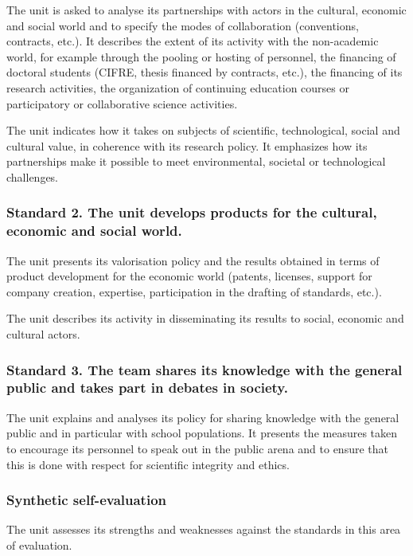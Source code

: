 \begin{hceresinstructions}
  The unit is asked to analyse its partnerships with actors in the
  cultural, economic and social world and to specify the modes of
  collaboration (conventions, contracts, etc.). It describes the extent of
  its activity with the non-academic world, for example through the
  pooling or hosting of personnel, the financing of doctoral students
  (CIFRE, thesis financed by contracts, etc.), the financing of its
  research activities, the organization of continuing education courses or
  participatory or collaborative science activities.

  The unit indicates how it takes on subjects of scientific,
  technological, social and cultural value, in coherence with its research
  policy. It emphasizes how its partnerships make it possible to meet
  environmental, societal or technological challenges.
\end{hceresinstructions}

\subsubsection*{Standard 2. The unit develops products for the cultural, economic and
social world.}

\begin{hceresinstructions}
  The unit presents its valorisation policy and the results obtained in
  terms of product development for the economic world (patents, licenses,
  support for company creation, expertise, participation in the drafting
  of standards, etc.).

  The unit describes its activity in disseminating its results to social,
  economic and cultural actors.
\end{hceresinstructions}

\subsubsection*{Standard 3. The team shares its knowledge with the general public and
takes part in debates in society.}

\begin{hceresinstructions}
  The unit explains and analyses its policy for sharing knowledge with the
  general public and in particular with school populations. It presents
  the measures taken to encourage its personnel to speak out in the public
  arena and to ensure that this is done with respect for scientific
  integrity and ethics.
\end{hceresinstructions}

\subsubsection*{Synthetic self-evaluation}

\begin{hceresinstructions}
  The unit assesses its strengths and weaknesses against the standards in
  this area of evaluation.
\end{hceresinstructions}
